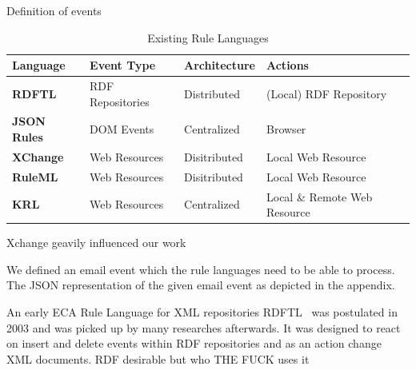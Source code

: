 Definition of events\cite{Adaikkalavan2007}


\begin{table}[ht]
  \centering
  \begin{tabular}{ | *{4}{l|} }
    \hline
    \textbf{Language} & \textbf{Event Type} & \textbf{Architecture} & \textbf{Actions} \\ \hline
    \textbf{RDFTL} & RDF Repositories & Distributed & (Local) RDF Repository \\ \hline
    \textbf{JSON Rules} & DOM Events & Centralized & Browser \\ \hline
    \textbf{XChange} & Web Resources & Disitributed & Local Web Resource \\ \hline
    \textbf{RuleML} & Web Resources & Disitributed & Local Web Resource \\ \hline
    \textbf{KRL} & Web Resources & Centralized & Local \& Remote Web Resource \\ \hline
  \end{tabular}
  \caption{Existing Rule Languages}
  \label{tab:rulelanguages}
\end{table}



Xchange geavily influenced our work

We defined an email event which the rule languages need to be able to process.
The JSON representation of the given email event as depicted in the appendix. %


An early ECA Rule Language for XML repositories
\textrm{RDFTL}~\cite{papamarkos2004rdftl} was postulated in 2003 and was picked up by many researches afterwards. It was designed to react on insert and delete events within RDF repositories and as an action change XML documents.
RDF desirable but who THE FUCK uses it

